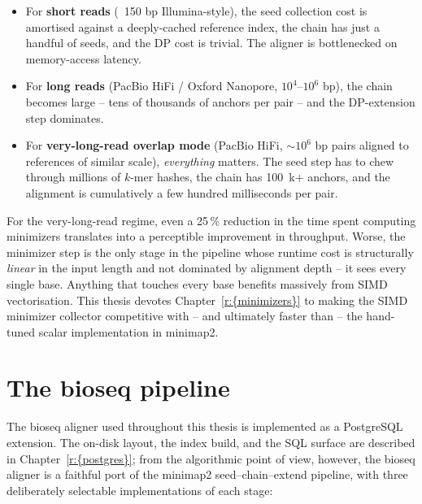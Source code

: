 \begin{itemize}
\item For \textbf{short reads} (~150 bp Illumina-style), the seed
  collection cost is amortised against a deeply-cached reference
  index, the chain has just a handful of seeds, and the DP cost is
  trivial. The aligner is bottlenecked on memory-access latency.
\item For \textbf{long reads} (PacBio HiFi / Oxford Nanopore,
  $10^4$--$10^6$ bp), the chain becomes large -- tens of thousands of
  anchors per pair -- and the DP-extension step dominates.
\item For \textbf{very-long-read overlap mode}
  (PacBio HiFi, ${\sim}10^6$ bp pairs aligned to references of similar
  scale), \emph{everything} matters. The seed step has to chew
  through millions of $k$-mer hashes, the chain has 100~k+ anchors,
  and the alignment is cumulatively a few hundred milliseconds per
  pair.
\end{itemize}

For the very-long-read regime, even a 25\,\% reduction in the time
spent computing minimizers translates into a perceptible improvement
in throughput. Worse, the minimizer step is the only stage in the
pipeline whose runtime cost is structurally \emph{linear} in the
input length and not dominated by alignment depth -- it sees every
single base. Anything that touches every base benefits massively from
SIMD vectorisation. This thesis devotes
Chapter~\ref{r:{minimizers}} to making the SIMD minimizer
collector competitive with -- and ultimately faster than -- the
hand-tuned scalar implementation in minimap2.

\section{The bioseq pipeline}

The bioseq aligner used throughout this thesis is implemented as a
PostgreSQL extension. The on-disk layout, the index build, and the
SQL surface are described in
Chapter~\ref{r:{postgres}}; from the algorithmic point of
view, however, the bioseq aligner is a faithful port of the minimap2
seed--chain--extend pipeline, with three deliberately selectable
implementations of each stage:

